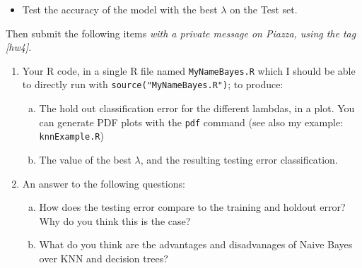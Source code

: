 \documentclass{article}
\begin{document}
\begin{exercise}
\begin{enumerate}
\begin{itemize}
    \item Test the accuracy of the model with the best $\lambda$ on the Test set.
    \end{itemize}
  \end{enumerate}
  Then submit the following items \emph{with a private message on Piazza, using the tag [hw4]}.
  \begin{enumerate}
  \item Your R code, in a single R file named \texttt{MyNameBayes.R} which I should be able to directly run with \texttt{source("MyNameBayes.R")}; to produce:
    \begin{enumerate}[(a)]
    \item The hold out classification error for the different
      lambdas, in a plot. You can generate PDF plots with the \texttt{pdf} command (see also my example: \texttt{knnExample.R})
    \item The value of the best $\lambda$, and the
      resulting testing error classification.
    \end{enumerate}
  \item An answer to the following questions:
    \begin{enumerate}[(a)]
    \item How does the testing error compare to the training and holdout
      error? Why do you think this is the case?
    \item What do you think are the advantages and disadvanages of Naive
      Bayes over KNN and decision trees?
    \end{enumerate}
  \end{enumerate}
\end{exercise}
\end{document}
